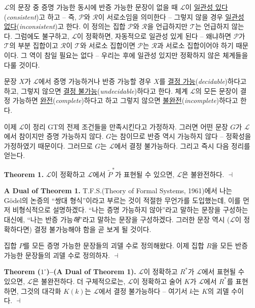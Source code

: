 \documentclass[12pt]{paper}
\newenvironment{context}[1][]{\noindent \textbf{{#1}.}}{\hfill $ \dashv $}
\begin{document}
  $\mathcal{L}$의 문장 중 증명 가능한 동시에 반증 가능한 문장이 없을 때 $\mathcal{L}$이 \underline{일관성 있다}(\textit{consistent})고 하고 --
  즉, $\mathcal{P}$와 $\mathcal{R}$이 서로소임을 의미한다 --
  그렇지 않을 경우 \underline{일관성 없다}(\textit{inconsistent})고 한다.
  이 정의는 집합 $\mathcal{P}$와 $\mathcal{R}$을 언급하지만 $\mathcal{T}$는 언급하지 않는다.
  그럼에도 불구하고, $\mathcal{L}$이 정확하면, 자동적으로 일관성 있게 된다 --
  왜냐하면 $\mathcal{P}$가 $\mathcal{T}$의 부분 집합이고 $\mathcal{R}$이 $\mathcal{T}$와 서로소 집합이면 $\mathcal{P}$는 $\mathcal{R}$과 서로소 집합이어야 하기 때문이다.
  그 역이 참일 필요는 없다 --
  우리는 후에 일관성 있지만 정확하지 않은 체계들을 다룰 것이다.
  
  문장 $X$가 $\mathcal{L}$에서 증명 가능하거나 반증 가능할 경우 $X$를 \underline{결정 가능}(\textit{decidable})하다고 하고,
  그렇지 않으면 \underline{결정 불가능}(\textit{undecidable})하다고 한다.
  체계 $\mathcal{L}$의 모든 문장이 결정 가능하면 \underline{완전}(\textit{complete})하다고 하고 그렇지 않으면 \underline{불완전}(\textit{incomplete})하다고 한다.

  이제 $\mathcal{L}$이 정리 GT의 전제 조건들을 만족시킨다고 가정하자.
  그러면 어떤 문장 $G$가 $\mathcal{L}$에서 참이지만 증명 가능하지 않다.
  $G$는 참이므로 반증 역시 가능하지 않다 --
  정확성을 가정하였기 때문이다.
  그러므로 $G$는 $\mathcal{L}$에서 결정 불가능하다.
  그리고 즉시 다음 정리를 얻는다.

  \begin{context}[Theorem 1]
    $\mathcal{L}$이 정확하고 $\mathcal{L}$에서 $\tilde{P}^{*}$가 표현될 수 있으면,
    $\mathcal{L}$은 불완전하다.
  \end{context}

  \begin{context}[A Dual of Theorem 1]
    T.F.S.(Theory of Formal Systems, 1961)에서 나는 G\"odel의 논증의 ``쌍대 형식''이라고 부르는 것이 적절한 무언가를 도입했는데,
    이를 먼저 비형식적으로 설명하겠다.
    ``나는 증명 가능하지 않아''라고 말하는 문장을 구성하는 대신에,
    ``나는 반증 가능\textit{해}''라고 말하는 문장을 구성하겠다.
    그러한 문장 역시 ($\mathcal{L}$이 정확하다면) 결정 불가능해야 함을 곧 보게 될 것이다.

    집합 $P$를 모든 증명 가능한 문장들의 괴델 수로 정의해왔다.
    이제 집합 $R$을 모든 반증 가능한 문장들의 괴델 수로 정의하자.
  \end{context}

  \begin{context}[Theorem ($1^{\circ}$)--(A Dual of Theorem 1)]
    $\mathcal{L}$이 정확하고 $R^{*}$가 $\mathcal{L}$에서 표현될 수 있으면,
    $\mathcal{L}$은 불완전하다.
    더 구체적으로는, $\mathcal{L}$이 정확하고 술어 $K$가 $\mathcal{L}$에서 $R^{*}$를 표현하면,
    그것의 대각화 $K \left( k \right)$는 $\mathcal{L}$에서 결정 불가능하다 --
    여기서 $k$는 $K$의 괴델 수이다.
  \end{context}
\end{document}
